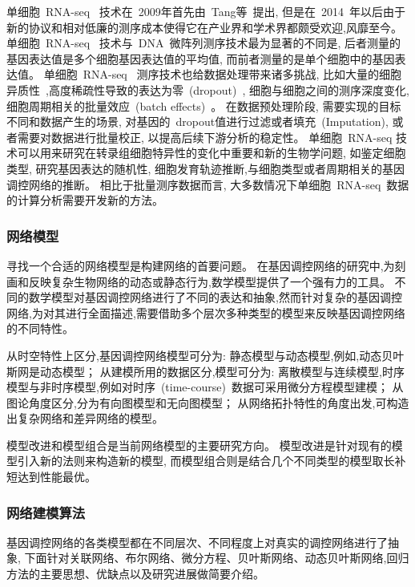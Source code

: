 单细胞~RNA-seq ~技术在~2009年首先由~Tang等~\cite{tang2009mrna}提出,
但是在~2014~年以后由于新的协议和相对低廉的测序成本使得它在产业界和学术界都颇受欢迎,风靡至今。
单细胞~RNA-seq ~技术与~DNA~微阵列测序技术最为显著的不同是,
后者测量的基因表达值是多个细胞基因表达值的平均值,
而前者测量的是单个细胞中的基因表达值。
单细胞~RNA-seq ~测序技术也给数据处理带来诸多挑战,
比如大量的细胞异质性~\cite{wagner2016revealing},高度稀疏性导致的表达为零~(dropout)~\cite{kharchenko2014bayesian}, 细胞与细胞之间的测序深度变化, 细胞周期相关的批量效应~(batch effects)~\cite{buettner2015computational}。
在数据预处理阶段, 需要实现的目标不同和数据产生的场景, 对基因的~dropout值进行过滤或者填充~(Imputation), 或者需要对数据进行批量校正, 以提高后续下游分析的稳定性。
单细胞~RNA-seq 技术可以用来研究在转录组细胞特异性的变化中重要和新的生物学问题,
如鉴定细胞类型, 研究基因表达的随机性, 细胞发育轨迹推断,与细胞类型或者周期相关的基因调控网络的推断。
相比于批量测序数据而言, 大多数情况下单细胞~RNA-seq~数据的计算分析需要开发新的方法。

\subsubsection{网络模型}
寻找一个合适的网络模型是构建网络的首要问题。
在基因调控网络的研究中,为刻画和反映复杂生物网络的动态或静态行为,数学模型提供了一个强有力的工具。
不同的数学模型对基因调控网络进行了不同的表达和抽象,然而针对复杂的基因调控网络,为对其进行全面描述,需要借助多个层次多种类型的模型来反映基因调控网络的不同特性。

从时空特性上区分,基因调控网络模型可分为:
静态模型与动态模型,例如,动态贝叶斯网是动态模型；
从建模所用的数据区分,模型可分为:
离散模型与连续模型,时序模型与非时序模型,例如对时序~(time-course)~数据可采用微分方程模型建模；
从图论角度区分,分为有向图模型和无向图模型；
从网络拓扑特性的角度出发,可构造出复杂网络和差异网络的模型。

模型改进和模型组合是当前网络模型的主要研究方向。
模型改进是针对现有的模型引入新的法则来构造新的模型,
而模型组合则是结合几个不同类型的模型取长补短达到性能最优。

\subsubsection{网络建模算法}
基因调控网络的各类模型都在不同层次、不同程度上对真实的调控网络进行了抽象,
下面针对关联网络、布尔网络、微分方程、贝叶斯网络、动态贝叶斯网络,回归方法的主要思想、优缺点以及研究进展做简要介绍。

